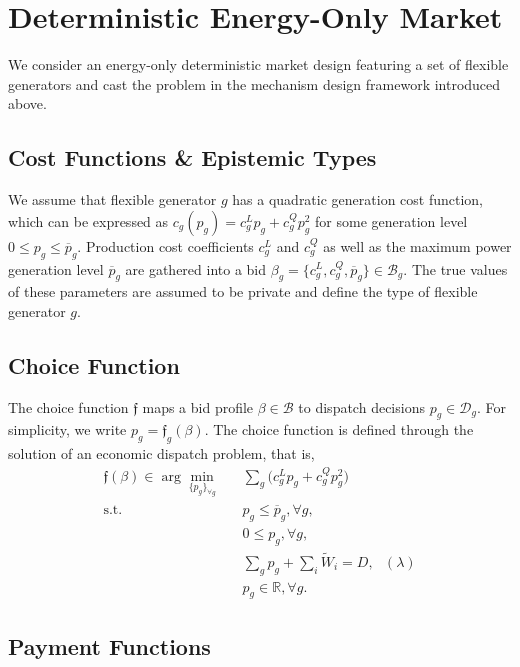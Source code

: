 \documentclass{article}
\begin{document}
\section{Deterministic Energy-Only Market}

We consider an energy-only deterministic market design featuring a set of flexible generators and cast the problem in the mechanism design framework introduced above.

\subsection{Cost Functions \& Epistemic Types}

We assume that flexible generator $g$ has a quadratic generation cost function, which can be expressed as $c_g(p_g) = c_g^L p_g + c_g^Q p_g^2$ for some generation level $0 \le p_g \le \overline{p}_g$. Production cost coefficients $c_g^L$ and $c_g^Q$ as well as the maximum power generation level $\overline{p}_g$ are gathered into a bid $\beta_g = \{c_g^L, c_g^Q, \overline{p}_g\} \in \mathcal{B}_g$. The true values of these parameters are assumed to be private and define the type of flexible generator $g$. 

\subsection{Choice Function}

The choice function $\mathfrak{f}$ maps a bid profile $\beta \in \mathcal{B}$ to dispatch decisions $p_g \in \mathcal{D}_g$. For simplicity, we write $p_g = \mathfrak{f}_g(\beta)$. The choice function is defined through the solution of an economic dispatch problem, that is,
\begin{align}
\mathfrak{f}(\beta) \in \arg \underset{\{p_g\}_{\forall g}}{\min} \hspace{10pt} & \sum_g \Big(c_g^Lp_g + c_g^Q p_g^2 \Big)\\
\mbox{s.t. } & p_g \le \overline{p}_g,\forall g,\\
& 0 \le p_g,\forall g,\\
& \sum_g p_g + \sum_i \tilde{W}_i = D, \mbox{ } (\lambda)\\
& p_g \in \mathbb{R}, \forall g.
\end{align}

\subsection{Payment Functions}
\end{document}
